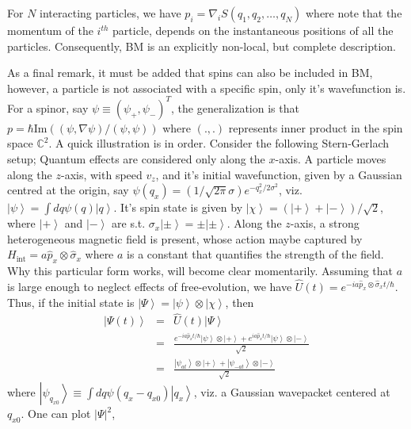 For $N$ interacting particles, we have $p_{i}=\nabla_{i}S(q_{1},q_{2},\dots,q_{N})$
where note that the momentum of the $i^{th}$ particle, depends on
the instantaneous positions of all the particles. Consequently, BM
is an explicitly non-local, but complete description. 

As a final remark, it must be added that spins can also be included
in BM, however, a particle is not associated with a specific spin,
only it's wavefunction is. For a spinor, say $\psi\equiv(\psi_{+},\psi_{-})^{T}$,
the generalization is that $p=\hbar\text{Im}((\psi,\nabla\psi)/(\psi,\psi))$
where $(.,.)$ represents inner product in the spin space $\mathbb{C}^{2}$.
A quick illustration is in order. Consider the following Stern-Gerlach
setup; Quantum effects are considered only along the $x$-axis. A
particle moves along the $z$-axis, with speed $v_{z}$, and it's
initial wavefunction, given by a Gaussian centred at the origin, say
$\psi(q_{x})=(1/\sqrt{2\pi}\sigma)e^{-q_{x}^{2}/2\sigma^{2}}$, viz.
$\left|\psi\right\rangle =\int dq\psi(q)\left|q\right\rangle $. It's
spin state is given by $\left|\chi\right\rangle =\left(\left|+\right\rangle +\left|-\right\rangle \right)/\sqrt{2}$,
where $\left|+\right\rangle $ and $\left|-\right\rangle $ are s.t.
$\sigma_{x}\left|\pm\right\rangle =\pm\left|\pm\right\rangle $. Along
the $z$-axis, a strong heterogeneous magnetic field is present, whose
action maybe captured by $H_{\text{int}}=a\hat{p}_{x}\otimes\hat{\sigma}_{x}$
where $a$ is a constant that quantifies the strength of the field.
Why this particular form works, will become clear momentarily. Assuming
that $a$ is large enough to neglect effects of free-evolution, we
have $\hat{U}(t)=e^{-ia\hat{p}_{x}\otimes\hat{\sigma}_{x}t/\hbar}$.
Thus, if the initial state is $\left|\Psi\right\rangle =\left|\psi\right\rangle \otimes\left|\chi\right\rangle $,
then 
\begin{eqnarray*}
\left|\Psi(t)\right\rangle  & = & \hat{U}(t)\left|\Psi\right\rangle \\
 & = & \frac{e^{-ia\hat{p}_{x}t/\hbar}\left|\psi\right\rangle \otimes\left|+\right\rangle +e^{ia\hat{p}_{x}t/\hbar}\left|\psi\right\rangle \otimes\left|-\right\rangle }{\sqrt{2}}\\
 & = & \frac{\left|\psi_{at}\right\rangle \otimes\left|+\right\rangle +\left|\psi_{-at}\right\rangle \otimes\left|-\right\rangle }{\sqrt{2}}
\end{eqnarray*}
where $\left|\psi_{q_{x0}}\right\rangle \equiv\int dq\psi(q_{x}-q_{x0})\left|q_{x}\right\rangle $,
viz. a Gaussian wavepacket centered at $q_{x0}$. One can plot $\left|\Psi\right|^{2}$,

